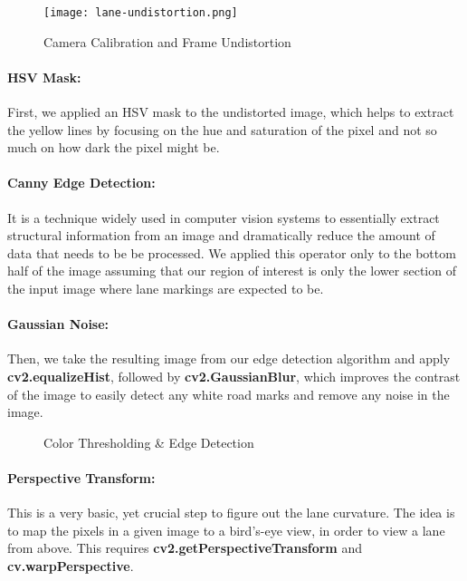 \begin{figure}[!h]
	\centering
    \texttt{[image: lane-undistortion.png]}
    \caption{Camera Calibration and Frame Undistortion}
\end{figure}

\paragraph{HSV Mask: } First, we applied an HSV mask to the undistorted image, which helps to extract the yellow lines by focusing on the hue and saturation of the pixel and not so much on how dark the pixel might be.


\paragraph{Canny Edge Detection: } It is a technique widely used in computer vision systems to essentially extract structural information from an image and dramatically reduce the amount of data that needs to be be processed. We applied this operator only to the bottom half of the image assuming that our region of interest is only the lower section of the input image where lane markings are expected to be.

\pagebreak

\paragraph{Gaussian Noise: } Then, we take the resulting image from our edge detection algorithm and apply \textbf{cv2.equalizeHist}, followed by \textbf{cv2.GaussianBlur}, which improves the contrast of the image to easily detect any white road marks and remove any noise in the image. 

\begin{figure}[h!]
  \centering
  \qquad
  \qquad
  \caption{Color Thresholding \& Edge Detection}
\end{figure}


\paragraph{Perspective Transform: } This is a very basic, yet crucial step to figure out the lane curvature. The idea is to map the pixels in a given image to a bird's-eye view, in order to view a lane from above.  This requires \textbf{cv2.getPerspectiveTransform} and \textbf{cv.warpPerspective}.


